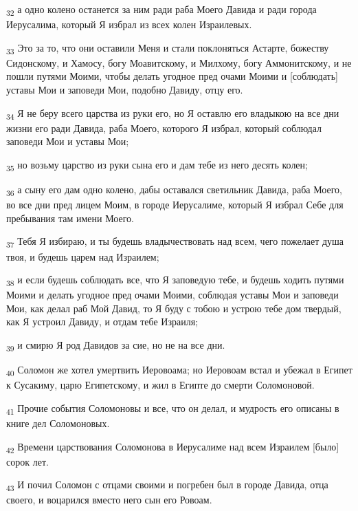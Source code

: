 \begin{tcolorbox}
\textsubscript{32} а одно колено останется за ним ради раба Моего Давида и ради города Иерусалима, который Я избрал из всех колен Израилевых.
\end{tcolorbox}
\begin{tcolorbox}
\textsubscript{33} Это за то, что они оставили Меня и стали поклоняться Астарте, божеству Сидонскому, и Хамосу, богу Моавитскому, и Милхому, богу Аммонитскому, и не пошли путями Моими, чтобы делать угодное пред очами Моими и [соблюдать] уставы Мои и заповеди Мои, подобно Давиду, отцу его.
\end{tcolorbox}
\begin{tcolorbox}
\textsubscript{34} Я не беру всего царства из руки его, но Я оставлю его владыкою на все дни жизни его ради Давида, раба Моего, которого Я избрал, который соблюдал заповеди Мои и уставы Мои;
\end{tcolorbox}
\begin{tcolorbox}
\textsubscript{35} но возьму царство из руки сына его и дам тебе из него десять колен;
\end{tcolorbox}
\begin{tcolorbox}
\textsubscript{36} а сыну его дам одно колено, дабы оставался светильник Давида, раба Моего, во все дни пред лицем Моим, в городе Иерусалиме, который Я избрал Себе для пребывания там имени Моего.
\end{tcolorbox}
\begin{tcolorbox}
\textsubscript{37} Тебя Я избираю, и ты будешь владычествовать над всем, чего пожелает душа твоя, и будешь царем над Израилем;
\end{tcolorbox}
\begin{tcolorbox}
\textsubscript{38} и если будешь соблюдать все, что Я заповедую тебе, и будешь ходить путями Моими и делать угодное пред очами Моими, соблюдая уставы Мои и заповеди Мои, как делал раб Мой Давид, то Я буду с тобою и устрою тебе дом твердый, как Я устроил Давиду, и отдам тебе Израиля;
\end{tcolorbox}
\begin{tcolorbox}
\textsubscript{39} и смирю Я род Давидов за сие, но не на все дни.
\end{tcolorbox}
\begin{tcolorbox}
\textsubscript{40} Соломон же хотел умертвить Иеровоама; но Иеровоам встал и убежал в Египет к Сусакиму, царю Египетскому, и жил в Египте до смерти Соломоновой.
\end{tcolorbox}
\begin{tcolorbox}
\textsubscript{41} Прочие события Соломоновы и все, что он делал, и мудрость его описаны в книге дел Соломоновых.
\end{tcolorbox}
\begin{tcolorbox}
\textsubscript{42} Времени царствования Соломонова в Иерусалиме над всем Израилем [было] сорок лет.
\end{tcolorbox}
\begin{tcolorbox}
\textsubscript{43} И почил Соломон с отцами своими и погребен был в городе Давида, отца своего, и воцарился вместо него сын его Ровоам.
\end{tcolorbox}
